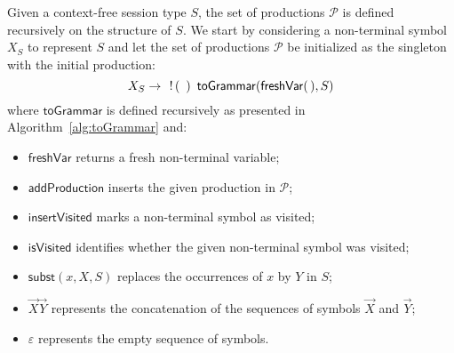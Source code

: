 Given a context-free session type $S$, the set of productions $\mathcal{P}$
is defined recursively on the structure of $S$. We start by considering 
a non-terminal symbol $X_S$ to represent $S$ and let the set of productions 
$\mathcal{P}$ be initialized as the singleton with the initial production: 
\begin{equation}
\label{initial_prod}
	X_S \rightarrow \enspace \,!\, ( \enspace )\enspace \mathsf{toGrammar}(\mathsf{freshVar}(\,),S) 	
\end{equation}
where $\mathsf{toGrammar}$ is defined recursively as presented 
in Algorithm~\ref{alg:toGrammar} and:
\begin{itemize}
	\item $\mathsf{freshVar}$ returns a fresh non-terminal variable;
	\item $\mathsf{addProduction}$ inserts the given production in $\mathcal{P}$;
	\item $\mathsf{insertVisited}$ marks a non-terminal symbol as visited;
	\item $\mathsf{isVisited}$ identifies whether the given non-terminal symbol was visited;
	\item $\mathsf{subst}(x,X,S)$ replaces the occurrences of $x$ by $Y$ in $S$;
	\item $\vec X \vec Y$ represents the concatenation of the sequences of symbols $\vec X$ and $\vec Y$;
	\item $\varepsilon$ represents the empty sequence of symbols.
\end{itemize}

